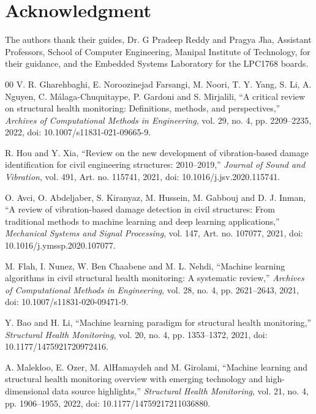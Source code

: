 \documentclass[conference]{IEEEtran}
\begin{document}
\section*{Acknowledgment}
The authors thank their guides, Dr. G Pradeep Reddy and Pragya Jha, Assistant Professors, School of Computer Engineering, Manipal Institute of Technology, for their guidance, and the Embedded Systems Laboratory for the LPC1768 boards.

\begin{thebibliography}{00}
 V. R. Gharehbaghi, E. Noroozinejad Farsangi, M. Noori, T. Y. Yang, S. Li, A. Nguyen, C. M\'alaga-Chuquitaype, P. Gardoni and S. Mirjalili, ``A critical review on structural health monitoring: Definitions, methods, and perspectives,'' \emph{Archives of Computational Methods in Engineering}, vol. 29, no. 4, pp. 2209--2235, 2022, doi: 10.1007/s11831-021-09665-9.

 R. Hou and Y. Xia, ``Review on the new development of vibration-based damage identification for civil engineering structures: 2010--2019,'' \emph{Journal of Sound and Vibration}, vol. 491, Art. no. 115741, 2021, doi: 10.1016/j.jsv.2020.115741.

 O. Avci, O. Abdeljaber, S. Kiranyaz, M. Hussein, M. Gabbouj and D. J. Inman, ``A review of vibration-based damage detection in civil structures: From traditional methods to machine learning and deep learning applications,'' \emph{Mechanical Systems and Signal Processing}, vol. 147, Art. no. 107077, 2021, doi: 10.1016/j.ymssp.2020.107077.

 M. Flah, I. Nunez, W. Ben Chaabene and M. L. Nehdi, ``Machine learning algorithms in civil structural health monitoring: A systematic review,'' \emph{Archives of Computational Methods in Engineering}, vol. 28, no. 4, pp. 2621--2643, 2021, doi: 10.1007/s11831-020-09471-9.

 Y. Bao and H. Li, ``Machine learning paradigm for structural health monitoring,'' \emph{Structural Health Monitoring}, vol. 20, no. 4, pp. 1353--1372, 2021, doi: 10.1177/1475921720972416.

 A. Malekloo, E. Ozer, M. AlHamaydeh and M. Girolami, ``Machine learning and structural health monitoring overview with emerging technology and high-dimensional data source highlights,'' \emph{Structural Health Monitoring}, vol. 21, no. 4, pp. 1906--1955, 2022, doi: 10.1177/14759217211036880.


\end{thebibliography}
\end{document}
